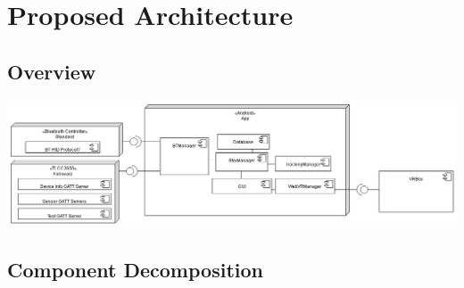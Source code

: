 \section{Proposed Architecture}

\subsection{Overview}

\includegraphics[scale=0.35]{pics/composite_app.png}

\subsection{Component Decomposition}

